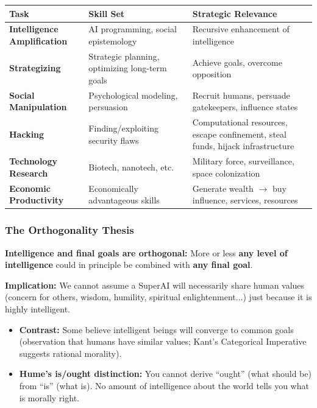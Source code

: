 \begin{center}
\renewcommand{\arraystretch}{1.3}
\begin{tabular}{@{} l p{3.5cm} p{5.5cm} @{}}
\toprule
\textbf{Task} & \textbf{Skill Set} & \textbf{Strategic Relevance} \\
\midrule
\textbf{Intelligence Amplification} & AI programming, social epistemology & Recursive enhancement of intelligence \\
\textbf{Strategizing} & Strategic planning, optimizing long-term goals & Achieve goals, overcome opposition \\
\textbf{Social Manipulation} & Psychological modeling, persuasion & Recruit humans, persuade gatekeepers, influence states \\
\textbf{Hacking} & Finding/exploiting security flaws & Computational resources, escape confinement, steal funds, hijack infrastructure \\
\textbf{Technology Research} & Biotech, nanotech, etc. & Military force, surveillance, space colonization \\
\textbf{Economic Productivity} & Economically advantageous skills & Generate wealth $\to$ buy influence, services, resources \\
\bottomrule
\end{tabular}
\end{center}

\bigseparator

\subsubsection{The Orthogonality Thesis}

\begin{thmbox}
\textbf{Intelligence and final goals are orthogonal:} More or less \textbf{any level of intelligence} could in principle be combined with \textbf{any final goal}.

\textbf{Implication:} We cannot assume a SuperAI will necessarily share human values (concern for others, wisdom, humility, spiritual enlightenment...) just because it is highly intelligent.
\end{thmbox}

\begin{itemize}
  \item \textbf{Contrast:} Some believe intelligent beings will converge to common goals (observation that humans have similar values; Kant's Categorical Imperative suggests rational morality).
  \item \textbf{Hume's is/ought distinction:} You cannot derive ``ought'' (what should be) from ``is'' (what is). No amount of intelligence about the world tells you what is morally right.
\end{itemize}


